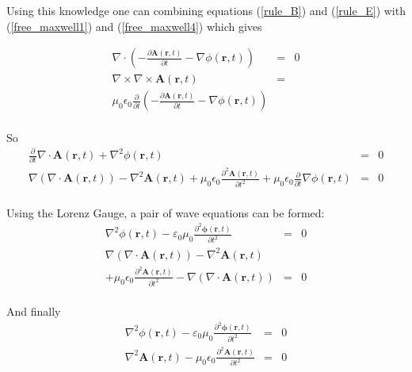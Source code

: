 \documentclass[a4paper,11pt]{thesis}
\begin{document}
Using this knowledge one can combining equations (\ref{rule_B}) and (\ref{rule_E}) with (\ref{free_maxwell1}) and (\ref{free_maxwell4}) which gives

\begin{eqnarray}
\nabla \cdot \left( -\frac{\partial \mathbf{A}(\mathbf{r},t)}{\partial t}-\nabla \phi(\mathbf{r},t) \right) &=&0 \\
\nabla \times \nabla \times \mathbf{A}(\mathbf{r},t)&=&  \nonumber \\
\mu_0 \epsilon_0 \frac{\partial }{\partial t} \left( -\frac{\partial \mathbf{A}(\mathbf{r},t)}{\partial t}-\nabla \phi(\mathbf{r},t)\right)
\end{eqnarray}\\

So\\

\begin{eqnarray}
\frac{\partial }{\partial t} \nabla \cdot  \mathbf{A}(\mathbf{r},t)+\nabla^2 \phi(\mathbf{r},t)  &=&0\nonumber \\
\nabla ( \nabla \cdot \mathbf{A}(\mathbf{r},t))-\nabla^2\mathbf{A}(\mathbf{r},t)+\mu_0 \epsilon_0 \frac{\partial^2 \mathbf{A}(\mathbf{r},t)}{\partial t^2}+ \mu_0 \epsilon_0 \frac{\partial }{\partial t} \nabla \phi(\mathbf{r},t)&=& 0\nonumber
\end{eqnarray}\\

Using the Lorenz Gauge, a pair of wave equations can be formed:\\
\begin{eqnarray}
\nabla^2 \phi(\mathbf{r},t)-\varepsilon_0 \mu_0\frac{\partial^2 \mathbf{\phi}(\mathbf{r},t)}{\partial t^2}  &=&0 \\
\nabla ( \nabla \cdot \mathbf{A}(\mathbf{r},t))-\nabla^2\mathbf{A}(\mathbf{r},t) \nonumber \\
+\mu_0 \epsilon_0 \frac{\partial^2 \mathbf{A}(\mathbf{r},t)}{\partial t^2}-   \nabla (\nabla \cdot \mathbf{A}(\mathbf{r},t))&=& 0
\end{eqnarray}\\

And finally\\

\begin{eqnarray}
\nabla^2 \phi(\mathbf{r},t)-\varepsilon_0 \mu_0\frac{\partial^2 \mathbf{\phi}(\mathbf{r},t)}{\partial t^2}  &=&0 \\
\nabla^2\mathbf{A}(\mathbf{r},t) -\mu_0 \epsilon_0 \frac{\partial^2 \mathbf{A}(\mathbf{r},t)}{\partial t^2}&=& 0
\end{eqnarray}\\
\end{document}
